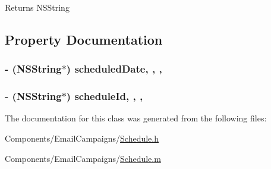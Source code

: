 \begin{DoxyReturn}{Returns}
N\-S\-String 
\end{DoxyReturn}


\subsection{Property Documentation}
\hypertarget{interface_schedule_a0e55944a0eac854b9e8eb185fc2766e2}{
\subsubsection[{scheduled\-Date}]{\setlength{\rightskip}{0pt plus 5cm}-\/ (N\-S\-String$\ast$) scheduled\-Date\hspace{0.3cm}{\ttfamily [read]}, {\ttfamily [write]}, {\ttfamily [nonatomic]}, {\ttfamily [strong]}}}\label{interface_schedule_a0e55944a0eac854b9e8eb185fc2766e2}
\hypertarget{interface_schedule_a00b1ae8330675f0890f917abfdbef460}{
\subsubsection[{schedule\-Id}]{\setlength{\rightskip}{0pt plus 5cm}-\/ (N\-S\-String$\ast$) schedule\-Id\hspace{0.3cm}{\ttfamily [read]}, {\ttfamily [write]}, {\ttfamily [nonatomic]}, {\ttfamily [strong]}}}\label{interface_schedule_a00b1ae8330675f0890f917abfdbef460}


The documentation for this class was generated from the following files\-:\begin{DoxyCompactItemize}
\item 
Components/\-Email\-Campaigns/\hyperlink{_schedule_8h}{Schedule.\-h}\item 
Components/\-Email\-Campaigns/\hyperlink{_schedule_8m}{Schedule.\-m}\end{DoxyCompactItemize}
